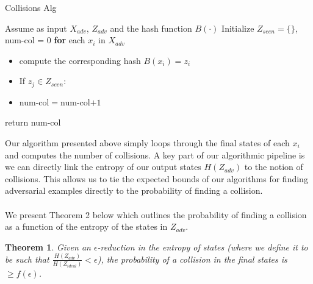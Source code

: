 \documentclass[letterpaper,twocolumn,10pt]{article}
\newtheorem{theorem}{Theorem}
\begin{document}
\begin{algorithm} \label{alg:col}
\caption{Collisions Alg}
\begin{algorithmic}[1]
\State Assume as input $X_{adv}$, $Z_{adv}$ and the hash function $B(\cdot)$
\State Initialize $Z_{seen} = \{\}$, num-col = 0
\State \textbf{for} each $x_{i}$ in $X_{adv}$
\begin{itemize}
\item compute the corresponding hash $B(x_{i}) = z_{i}$
\item If $z_{j} \in Z_{seen}$:
\item  num-col$=$num-col$ + 1$
\end{itemize}
\item return num-col
\end{algorithmic}
\end{algorithm}

Our algorithm presented above simply loops through the final states of each $x_{i}$ and computes the number of collisions. A key part of our algorithmic pipeline is we can directly link the entropy of our output states $H(Z_{adv})$ to the notion of collisions. This allows us to tie the expected bounds of our algorithms for finding adversarial examples directly to the probability of finding a collision.  
\\
\\
We present Theorem 2 below which outlines the probability of finding a collision as a function of the entropy of the states in  $Z_{adv}$.

\begin{theorem}
Given an $\epsilon$-reduction in the entropy of states (where we define it to be such that $\frac{H(Z_{adv})}{H(Z_{ideal})} < \epsilon$), the probability of a collision in the final states is $\geq f(\epsilon)$. 
\end{theorem}
\end{document}
